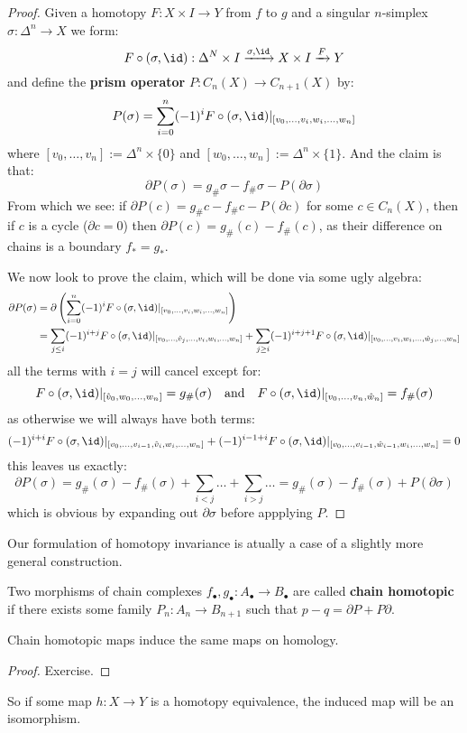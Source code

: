 \documentclass[a4paper]{article}
\begin{document}
\begin{theorem}
\begin{proof}
Given a homotopy $F:X\times I\rightarrow Y$ from $f$ to $g$ and a singular $n$-simplex $\sigma:\Delta^n\rightarrow X$ we form:\[
    F\circ(\sigma,\id):\Delta^N\times I \xrightarrow{\sigma,\id} X\times I \xrightarrow{F} Y
\]
and define the \textbf{prism operator} $P:C_n(X)\rightarrow C_{n+1}(X)$ by:\[
    P(\sigma)=\sum_{i=0}^n (-1)^i F\circ(\sigma,\id)\vert_{[v_0,\ldots,v_i,w_i,\ldots,w_n]}
\]
where $[v_0,\ldots,v_n]:= \Delta^n\times\{0\}$ and $[w_0,\ldots,w_n]:= \Delta^n\times\{1\}$.
And the claim is that: \[
    \partial P(\sigma) = g_\#\sigma-f_\#\sigma-P(\partial\sigma)
\]
From which we see: if $\partial P(c) = g_\#c-f_\#c-P(\partial c)$ for some $c\in C_n(X)$, then if $c$ is a cycle ($\partial c=0$) then $\partial P(c) = g_\#(c)-f_\#(c)$, as their difference on chains is a boundary $f_*=g_*$.

We now look to prove the claim, which will be done via some ugly algebra:\begin{align*}
    \partial P(\sigma) &= \partial\pr{\sum_{i=0}^n (-1)^i F\circ(\sigma,\id)\vert_{[v_0,\ldots,v_i,w_i,\ldots,w_n]}} \\
    &= \sum_{j\leq i} (-1)^{i+j } F\circ(\sigma,\id)\vert_{[v_0,\ldots,\hat{v}_j,\ldots,v_i,w_i,\ldots,w_n]} + 
    \sum_{j\geq i} (-1)^{i+j+1} F\circ(\sigma,\id)\vert_{[v_0,\ldots,v_i,w_i,\ldots,\hat{w}_j,\ldots,w_n]}
\end{align*}
all the terms with $i=j$ will cancel except for:\[
    F\circ(\sigma,\id)\vert_{[\hat{v}_0,w_0,\ldots,w_n]} =g_\#(\sigma)
    \quad \text{and} \quad 
    F\circ(\sigma,\id)\vert_{[v_0,\ldots,v_n,\hat{w}_n]} = f_\#(\sigma)
\]
as otherwise we will always have both terms:\[
    (-1)^{i+i}F\circ(\sigma,\id)\vert_{[v_0,\ldots,v_{i-1},\hat{v}_i,w_i,\ldots,w_n]} + 
    (-1)^{i-1+i}F\circ(\sigma,\id)\vert_{[v_0,\ldots,v_{i-1},\hat{w}_{i-1},w_i,\ldots,w_n]} = 0
\]
this leaves us exactly:\[
    \partial P(\sigma) = g_\#(\sigma) - f_\#(\sigma) + \sum_{i<j}\ldots + \sum_{i>j}\ldots = g_\#(\sigma)-f_\#(\sigma) + P(\partial \sigma)
\]
which is obvious by expanding out $\partial \sigma$ before appplying $P$.
\end{proof}
\end{theorem}
Our formulation of homotopy invariance is atually a case of a slightly more general construction.
\begin{definition}
    Two morphisms of chain complexes $f_\bullet,g_\bullet:A_\bullet\rightarrow B_\bullet$ are called \textbf{chain homotopic} if there exists some family $P_n:A_n\rightarrow B_{n+1}$ such that $p-q = \partial P + P\partial$. %
\end{definition}
\begin{proposition}
    Chain homotopic maps induce the same maps on homology.
    \begin{proof}
        Exercise.
    \end{proof}
\end{proposition}
So if some map $h:X\rightarrow Y$ is a homotopy equivalence, the induced map will be an isomorphism.
\end{document}
